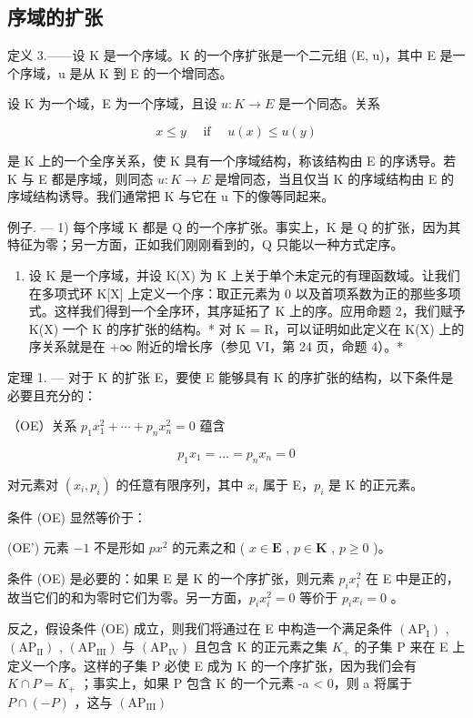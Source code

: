 \subsection{序域的扩张}

定义 3.——设 K 是一个序域。K 的一个序扩张是一个二元组 (E, u)，其中 E 是一个序域，u 是从 K 到 E 的一个增同态。

设 K 为一个域，E 为一个序域，且设 \(u: K \rightarrow E\) 是一个同态。关系

\[
x \leqslant y \quad \text { if } \quad u (x) \leqslant u (y)
\]

是 K 上的一个全序关系，使 K 具有一个序域结构，称该结构由 E 的序诱导。若 K 与 E 都是序域，则同态 \(u: K \rightarrow E\) 是增同态，当且仅当 K 的序域结构由 E 的序域结构诱导。我们通常把 K 与它在 u 下的像等同起来。

例子. --- 1) 每个序域 K 都是 Q 的一个序扩张。事实上，K 是 Q 的扩张，因为其特征为零；另一方面，正如我们刚刚看到的，Q 只能以一种方式定序。

\begin{enumerate}
\def\labelenumi{\arabic{enumi})}
\setcounter{enumi}{1}
\tightlist
\item
  设 K 是一个序域，并设 K(X) 为 K 上关于单个未定元的有理函数域。让我们在多项式环 K{[}X{]} 上定义一个序：取正元素为 0 以及首项系数为正的那些多项式。这样我们得到一个全序环，其序延拓了 K 上的序。应用命题 2，我们赋予 K(X) 一个 K 的序扩张的结构。* 对 K = R，可以证明如此定义在 K(X) 上的序关系就是在 +∞ 附近的增长序（参见 VI，第 24 页，命题 4）。*
\end{enumerate}

定理 1. --- 对于 K 的扩张 E，要使 E 能够具有 K 的序扩张的结构，以下条件是必要且充分的：

（OE）关系 \(p_{1}x_{1}^{2} + \cdots + p_{n}x_{n}^{2} = 0\) 蕴含

\[
p _ {1} x _ {1} = \dots = p _ {n} x _ {n} = 0
\]

对元素对 \((x_{i},p_{i})\) 的任意有限序列，其中 \(x_{i}\) 属于 E，\(p_i\) 是 K 的正元素。

条件 (OE) 显然等价于：

(OE') 元素 \(-1\) 不是形如 \(px^2\) 的元素之和 ( \(x \in \mathbf{E}\) , \(p \in \mathbf{K}\) , \(p \geqslant 0\) )。

条件 (OE) 是必要的：如果 E 是 K 的一个序扩张，则元素 \(p_{i}x_{i}^{2}\) 在 E 中是正的，故当它们的和为零时它们为零。另一方面，\(p_{i}x_{i}^{2}=0\) 等价于 \(p_{i}x_{i}=0\) 。

反之，假设条件 (OE) 成立，则我们将通过在 E 中构造一个满足条件 \((\mathrm{AP}_{\mathrm{I}})\) , \((\mathrm{AP}_{\mathrm{II}})\) , \((\mathrm{AP}_{\mathrm{III}})\) 与 \((\mathrm{AP}_{\mathrm{IV}})\) 且包含 K 的正元素之集 \(K_{+}\) 的子集 P 来在 E 上定义一个序。这样的子集 P 必使 E 成为 K 的一个序扩张，因为我们会有 \(K \cap P = K_{+}\) ；事实上，如果 P 包含 K 的一个元素 -a \textless{} 0，则 a 将属于 \(P \cap (-P)\) ，这与 \((\mathrm{AP}_{\mathrm{III}})\)

